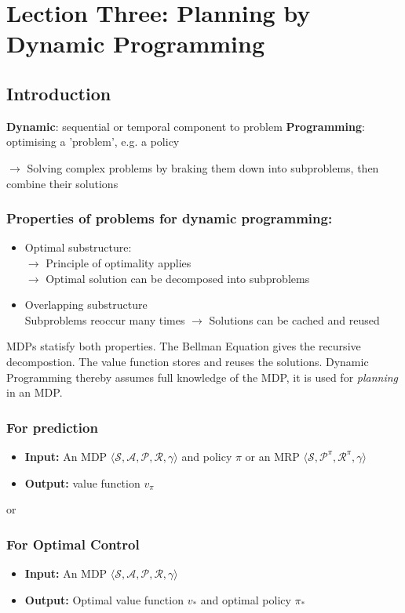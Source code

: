 \documentclass[10pt]{article}
\begin{document}
\section{Lection Three: Planning by Dynamic Programming}
\subsection{Introduction}
\textbf{Dynamic}: sequential or temporal component to problem \newline
\textbf{Programming}: optimising a 'problem', e.g. a policy\newline

$\rightarrow$ Solving complex problems by braking them down into subproblems, then combine their solutions

\subsubsection*{Properties of problems for dynamic programming:}
\begin{itemize}
\item Optimal substructure: \\
$\rightarrow$ Principle of optimality applies \\
$\rightarrow$ Optimal solution can be decomposed into subproblems
\item Overlapping substructure \\
Subproblems reoccur many times $\rightarrow$ Solutions can be cached and reused
\end{itemize}

MDPs statisfy both properties. The Bellman Equation gives the recursive decompostion. The value function stores and reuses the solutions. Dynamic Programming thereby assumes full knowledge of the MDP, it is used for \textit{planning} in an MDP.

\subsubsection*{For prediction}
\begin{itemize}
\item \textbf{Input:} An MDP $\langle \mathcal{S,A,P,R,\gamma} \rangle$ and policy $\pi$ or an MRP $\langle \mathcal{S,P^{\pi},R^{\pi},\gamma} \rangle$ 
\item \textbf{Output:} value function $v_{\pi}$
\end{itemize}
or
\subsubsection*{For Optimal Control}
\begin{itemize}
\item \textbf{Input:} An MDP $\langle \mathcal{S,A,P,R,\gamma} \rangle$ 
\item \textbf{Output:} Optimal value function $v_{*}$ and optimal policy $\pi_{*}$
\end{itemize}
\end{document}
